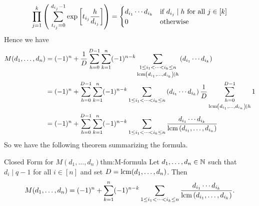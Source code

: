 $$\prod_{j=1}^k\left(\; \sum_{t_{i_j}=0}^{d_{i_j}-1}\exp\left[ t_{i_j}\frac{h}{d_{i_j}} \right]\right)=\begin{cases}
  d_{i_1}\cdots d_{i_k}& \text{if $d_{i_j}\mid h$ for all $j\in[k]$}\\ 
  0 & \text{otherwise}
\end{cases}$$Hence we have \begin{align*}
  M(d_1,\dots, d_n) & = (-1)^n+\frac1D\sum_{h=0}^{D-1} \sum_{k=1}^n(-1)^{n-k}\sum_{\substack{1\leq i_1<\cdots <i_k\leq n\\[1pt] \operatorname{lcm}\left(d_{i_1},\dots,d_{i_k}\right)\mid h}}\left(d_{i_1}\cdots d_{i_k}\right)\\ 
  & = (-1)^n+\sum_{h=0}^{D-1} \sum_{k=1}^n(-1)^{n-k}\sum_{1\leq i_1<\cdots <i_k\leq n}\left(d_{i_1}\cdots d_{i_k}\right)\frac1D\sum_{\substack{h=0\\[1pt] \operatorname{lcm}\left(d_{i_1},\dots, d_{i_n}\right)\mid h}}^{D-1}1\\ 
  & = (-1)^n+\sum_{h=0}^{D-1} \sum_{k=1}^n(-1)^{n-k}\sum_{1\leq i_1<\cdots <i_k\leq n}\frac{d_{i_1}\cdots d_{i_k}}{\operatorname{lcm}\left(d_{i_1},\dots, d_{i_n}\right)}
\end{align*}
So we have the following theorem summarizing the formula.
\begin{Theorem}{Closed Form for $M(d_1,\dots,d_n)$}{thm:M-formula}
  Let $d_1,\dots,d_n\in\mathbb{N}$ such that $d_i\mid q-1$ for all $i\in[n]$ and set $D=\operatorname{lcm}(d_1,\dots,d_n)$. Then
  $$M(d_1,\dots,d_n)=(-1)^n+\sum_{k=1}^n(-1)^{n-k}\sum_{1\leq i_1<\cdots<i_k\leq n}\frac{d_{i_1}\cdots d_{i_k}}{\operatorname{lcm}\left(d_{i_1},\dots,d_{i_k}\right)}.$$
\end{Theorem}